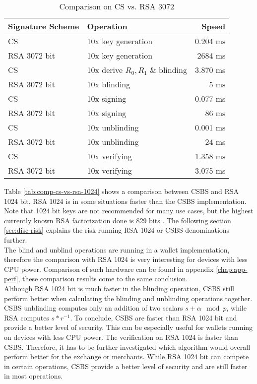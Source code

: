 \begin{table}[h]
    \centering
    \setupBfhTabular
    \begin{tabular}{llr}
        \rowcolor{BFH-tablehead}
        \textbf{Signature Scheme} & \textbf{Operation} & \textbf{Speed} \\\hline
        CS & 10x key generation & 0.204 ms \\\hline
        RSA 3072 bit & 10x key generation & 2684 ms \\\hline
        \hline
        CS & 10x derive $R_0, R_1$ \& blinding  & 3.870 ms \\\hline
        RSA 3072 bit & 10x blinding & 5 ms \\\hline
        \hline
        CS & 10x signing & 0.077 ms \\\hline
        RSA 3072 bit & 10x signing & 86 ms \\\hline
        \hline
        CS & 10x unblinding & 0.001 ms \\\hline
        RSA 3072 bit & 10x unblinding & 24 ms \\\hline
        \hline
        CS & 10x verifying & 1.358 ms \\\hline
        RSA 3072 bit & 10x verifying & 3.075 ms \\\hline
    \end{tabular}
    \caption{Comparison on CS vs. RSA 3072}
    \label{tab:comp-cs-vs-rsa-3072}
\end{table}

Table \ref{tab:comp-cs-vs-rsa-1024} shows a comparison between \gls{CSBS} and RSA 1024 bit.
RSA 1024 is in some situations faster than the \gls{CSBS} implementation.
Note that 1024 bit keys are not recommended for many use cases, but the highest currently known RSA factorization done is 829 bits \cite{enwiki:1055393696}.
The following section \ref{sec:disc-risk} explains the risk running RSA 1024 or \gls{CSBS} denominations further.\\
The blind and unblind operations are running in a wallet implementation, therefore the comparison with RSA 1024 is very interesting for devices with less CPU power.
Comparison of such hardware can be found in appendix \ref{chap:app-perf}, these comparison results come to the same conclusion.\\
Although RSA 1024 bit is much faster in the blinding operation, \gls{CSBS} still perform better when calculating the blinding and unblinding operations together.
\gls{CSBS} unblinding computes only an addition of two scalars $s + \alpha \mod p$, while RSA computes $s * r^{-1}$.
To conclude, \gls{CSBS} are faster than RSA 1024 bit and provide a better level of security.
This can be especially useful for wallets running on devices with less CPU power.
The verification on RSA 1024 is faster than \gls{CSBS}.
Therefore, it has to be further investigated which algorithm would overall perform better for the exchange or merchants.
While RSA 1024 bit can compete in certain operations, \gls{CSBS} provide a better level of security and are still faster in most operations.

